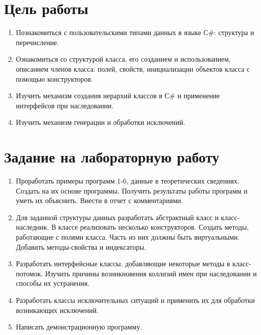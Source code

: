 \documentclass[a4paper,14pt]{extarticle}
\begin{document}

    \section{Цель работы}
    \begin{enumerate}
        \item Познакомиться с пользовательскими типами данных в языке С\#:
              структура и перечисление.
        \item Ознакомиться со структурой класса, его созданием и использованием,
              описанием членов класса: полей, свойств, инициализации объектов
              класса с помощью конструкторов.
        \item Изучить механизм создания иерархий классов в С\# и применение
              интерфейсов при наследовании.
        \item Изучить механизм генерации и обработки исключений.
    \end{enumerate}

    \section{Задание на лабораторную работу}
    \begin{enumerate}
        \item Проработать примеры программ 1-6, данные в теоретических сведениях.
              Создать на их основе программы. Получить результаты работы программ
              и уметь их объяснить. Внести в отчет с комментариями.
        \item Для заданной структуры данных разработать абстрактный класс и класс-наследник.
              В классе реализовать несколько конструкторов. Создать методы, работающие с
              полями класса. Часть из них должны быть виртуальными. Добавить методы-свойства
              и индексаторы.
        \item Разработать интерфейсные классы, добавляющие некоторые методы в класс-потомок.
              Изучить причины возникновения коллизий имен при наследовании и способы их устранения.
        \item Разработать классы исключительных ситуаций и применить их для обработки возникающих исключений.
        \item Написать демонстрационную программу.
    \end{enumerate}
\end{document}
